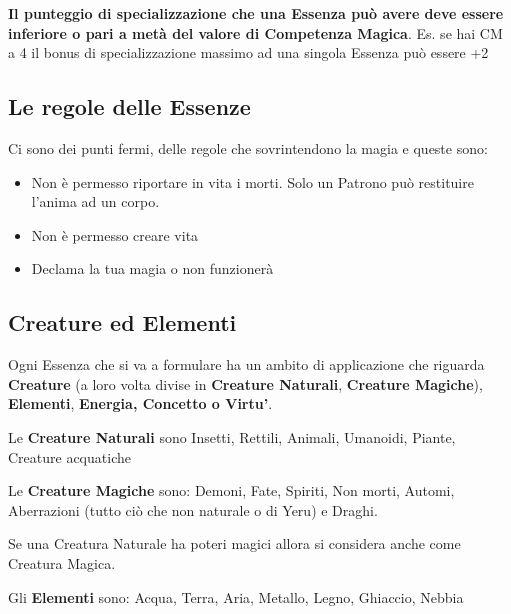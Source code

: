 \documentclass[a4paper,11pt,twoside,openany]{book}
\begin{document}
\bigskip

\textbf{Il punteggio di specializzazione che una Essenza può avere deve essere inferiore o pari a metà del valore di Competenza Magica}. Es. se hai CM a 4 il bonus di specializzazione massimo ad una singola Essenza può essere +2

\subsection{Le regole delle Essenze}

\label{le-regole-delle-essenze}

Ci sono dei punti fermi, delle regole che sovrintendono la magia e queste sono:
\begin{itemize}
	\item Non è permesso riportare in vita i morti. Solo un Patrono può restituire l'anima ad un corpo.

	\item Non è permesso creare vita

	\item Declama la tua magia o non funzionerà

\end{itemize}

\subsection{Creature ed Elementi}

\label{creature-ed-elementi}

Ogni Essenza che si va a formulare ha un ambito di applicazione che riguarda \textbf{Creature} (a loro volta divise in \textbf{Creature Naturali}, \textbf{Creature Magiche}), \textbf{Elementi}, \textbf{Energia, Concetto o Virtu'}.
\bigskip

Le \textbf{Creature Naturali} sono Insetti, Rettili, Animali, Umanoidi, Piante, Creature acquatiche

Le \textbf{Creature Magiche} sono: Demoni, Fate, Spiriti, Non morti, Automi, Aberrazioni (tutto ciò che non naturale o di Yeru) e Draghi.

Se una Creatura Naturale ha poteri magici allora si considera anche come Creatura Magica.

Gli \textbf{Elementi} sono: Acqua, Terra, Aria, Metallo, Legno, Ghiaccio, Nebbia
\end{document}
